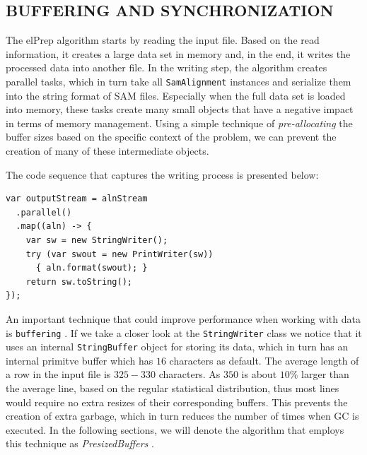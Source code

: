 \documentclass[a4paper,twoside]{article}
\begin{document}
\subsection{\uppercase{Buffering and Synchronization}}
\label{subsec:buffering}

The elPrep algorithm starts by reading the input file. 
Based on the read information, it creates a large data set in memory and, in the end, it writes the processed data into another file.
In the writing step, the algorithm creates parallel tasks, which in turn take all \texttt{SamAlignment} instances and serialize them into the string format of SAM files.
Especially when the full data set is loaded into memory, these tasks create many small objects that have a negative impact in terms of memory management. Using a simple technique of {\textit{pre-allocating} } the buffer sizes based on the specific context of the problem, we can prevent the creation of many of these intermediate objects.

The code sequence that captures the writing process is presented below:
\begin{verbatim}
var outputStream = alnStream
  .parallel()
  .map((aln) -> {
    var sw = new StringWriter();
    try (var swout = new PrintWriter(sw))
      { aln.format(swout); }
    return sw.toString();
});
\end{verbatim}

An important technique that could improve performance when working with data is {\texttt{buffering}} \cite{oaks:2014}.
If we take a closer look at the {\texttt{StringWriter}} class we notice that it uses an internal {\texttt{StringBuffer}} object for storing its data, which in turn has an internal primitve buffer   which has $16$ characters as default.
The average length of a row in the input file is $325 - 330$ characters.
As $350$ is about $10\%$ larger than the average line, based on the regular statistical distribution, thus most lines would require no extra resizes of their corresponding buffers. This prevents the creation of extra garbage, which in turn reduces the number of times when GC is executed.
In the following sections, we will denote the algorithm that employs this technique as {\textit{PresizedBuffers} }.
\end{document}
